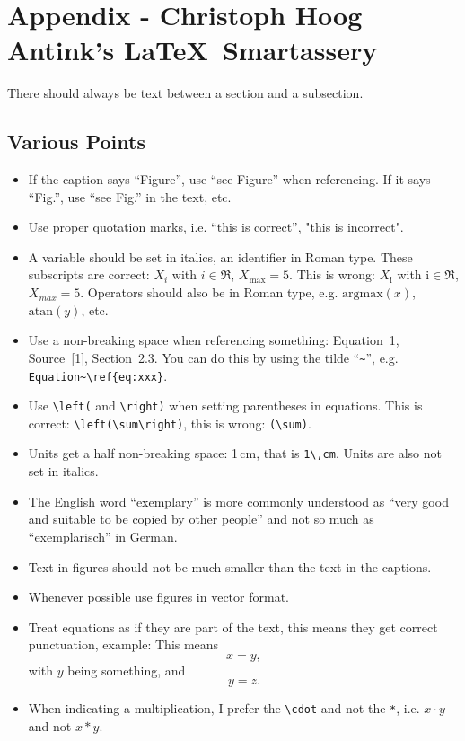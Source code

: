 \chapter{Appendix - Christoph Hoog Antink's \LaTeX~Smartassery}
There should always be text between a section and a subsection.
\section{Various Points}
\begin{itemize}
    \item If the caption says ``Figure'', use ``see Figure'' when referencing. If it says ``Fig.'', use ``see Fig.'' in the text, etc.
    \item Use proper quotation marks, i.e. ``this is correct'', "this is incorrect".
    \item A variable should be set in italics, an identifier in Roman type. These subscripts are correct: $X_i$ with $i \in \Re$, $X_\mathrm{max} = 5$. This is wrong: $X_\mathrm{i}$ with $\mathrm{i} \in \Re$, $X_{max} = 5$. Operators should also be in Roman type, e.g. $\mathrm{arg max}\left(x\right)$, $\mathrm{atan}\left(y\right)$, etc.
    \item Use a non-breaking space when referencing something: Equation~1, Source~[1], Section~2.3. You can do this by using the tilde ``\verb|~|'', e.g. \verb|Equation~\ref{eq:xxx}|.
    \item Use \verb|\left(| and \verb|\right)| when setting parentheses in equations. This is correct: \verb|\left(\sum\right)|, this is wrong: \verb|(\sum)|.
    \item Units get a half non-breaking space: 1\,cm, that is \verb|1\,cm|. Units are also not set in italics.
    \item The English word ``exemplary'' is more commonly understood as ``very good and suitable to be copied by other people'' and not so much as ``exemplarisch'' in German.
    \item Text in figures should not be much smaller than the text in the captions.
    \item Whenever possible use figures in vector format.
    \item Treat equations as if they are part of the text, this means they get correct punctuation, example: This means
    \begin{equation}
        x = y,
    \end{equation}
    with $y$ being something, and
    \begin{equation}
        y = z.
    \end{equation}
    \item When indicating a multiplication, I prefer the \verb|\cdot| and not the \verb|*|, i.e. $x\cdot y$ and not $x*y$.
\end{itemize}




